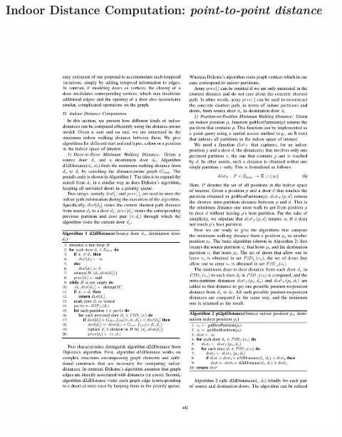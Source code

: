 \begin{frame}
\frametitle{Indoor Distance Computation: \emph{point-to-point distance}}

\begin{columns}[c]

  \begin{figure}[tb]
    \includegraphics[width=\columnwidth]{figures/2-5/2-5-4.pdf}
  \end{figure}



\end{columns}

\end{frame}


